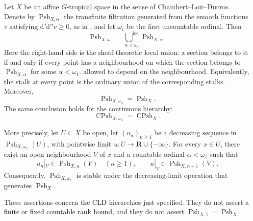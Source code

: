 
Let \(X\) be an affine \(G\)-tropical space in the sense of
Chambert--Loir--Ducros.  Denote by
\(\operatorname{Psh}_{X,\alpha}\) the transfinite filtration generated from
the smooth functions \(v\) satisfying
\(\mathrm d'\mathrm d''v\geq0\), as in
\cite[Lemma~8.1.4]{CLD25}, and let \(\omega _1\) be the first uncountable
ordinal.  Then
\begin{equation}
 \label{eq:p072-omega-one-local-union}
 \operatorname{Psh}_{X,\omega _1}
 =
 \underset{\alpha<\omega _1}{\bigcup\nolimits^{\mathrm{loc}}}
 \operatorname{Psh}_{X,\alpha}.
\end{equation}
Here the right-hand side is the sheaf-theoretic local union: a section
belongs to it if and only if every point has a neighbourhood on which the
section belongs to \(\operatorname{Psh}_{X,\alpha}\) for some
\(\alpha<\omega _1\), allowed to depend on the neighbourhood.  Equivalently,
the stalk at every point is the ordinary union of the corresponding stalks.
Moreover,
\begin{equation}
 \label{eq:p072-omega-one-psh}
             \operatorname{Psh}_{X,\omega _1}
             =\operatorname{Psh}_X.
\end{equation}
The same conclusion holds for the continuous hierarchy:
\begin{equation}
 \label{eq:p072-omega-one-cpsh}
             \operatorname{CPsh}_{X,\omega _1}
             =\operatorname{CPsh}_X.
\end{equation}

More precisely, let \(U\subseteq X\) be open, let
\((u_n)_{n\geq1}\) be a decreasing sequence in
\(\operatorname{Psh}_{X,\omega _1}(U)\), with pointwise limit
\(u:U\to\mathbf R\cup\{-\infty\}\).
For every \(x\in U\), there exist an open neighbourhood \(V\) of \(x\) and
a countable ordinal \(\alpha<\omega _1\) such that
\begin{equation}
 \label{eq:p072-common-countable-rank}
       u_n|_V\in\operatorname{Psh}_{X,\alpha}(V)\quad(n\geq1),
       \qquad
       u|_V\in\operatorname{Psh}_{X,\alpha+1}(V).
\end{equation}
Consequently, \(\operatorname{Psh}_{X,\omega _1}\) is stable under the
decreasing-limit operation that generates \(\operatorname{Psh}_X\).

These assertions concern the CLD hierarchies just specified.  They do not
assert a finite or fixed countable rank bound, and they do not assert
\(\operatorname{Psh}_{X,1}=\operatorname{Psh}_X\).
